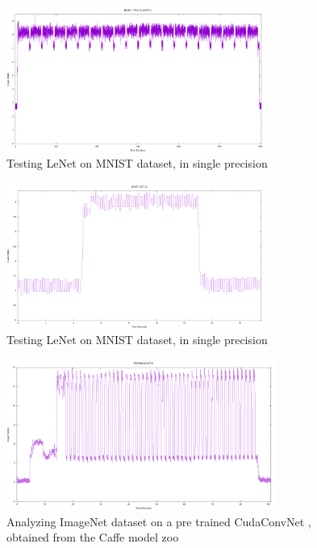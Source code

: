 \documentclass[letterpaper, 10 pt, conference]{ieeeconf}
\begin{document}
          \begin{figure}[h]
              \centering
              \includegraphics[width=85mm,scale=1]{lenet_train_single.png}
              \caption{Testing LeNet on MNIST dataset, in single precision}
              \label{lenet_train_single}
          \end{figure}
          
          \begin{figure}[h]
              \centering
              \includegraphics[width=85mm,scale=1]{lenet_test_single.png}
              \caption{Testing LeNet on MNIST dataset, in single precision}
              \label{lenet_test_single}
          \end{figure}
          
          \begin{figure}[h]
              \centering
              \includegraphics[width=88mm,scale=1.5]{TESTIMAGENET32.png}
              \caption{Analyzing ImageNet dataset on a pre trained CudaConvNet
                , obtained from the Caffe model zoo}
              \label{fig:imageNet}
          \end{figure}
          
\end{document}
